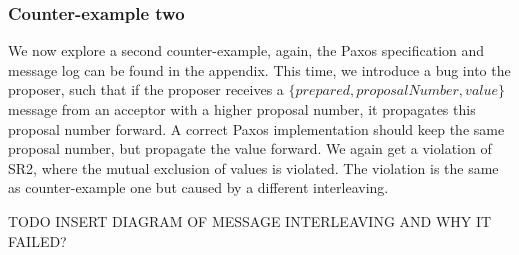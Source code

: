 \subsubsection{Counter-example two}
We now explore a second counter-example, again, the Paxos specification and message log can be found in the appendix. This time, we introduce a bug into the proposer, such that if the proposer receives a $\{prepared, proposalNumber, value\}$ message from an acceptor with a higher proposal number, it propagates this proposal number forward. A correct Paxos implementation should keep the same proposal number, but propagate the value forward. We again get a violation of SR2, where the mutual exclusion of values is violated. The violation is the same as counter-example one but caused by a different interleaving. 
\par
TODO INSERT DIAGRAM OF MESSAGE INTERLEAVING AND WHY IT FAILED?
\par
